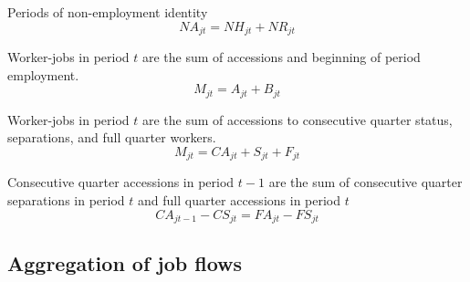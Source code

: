 \begin{definition}
Periods of non-employment identity 
\begin{equation*}
NA_{jt} = NH_{jt} + NR_{jt}
\end{equation*}
\end{definition}

\begin{definition}
Worker-jobs in period $t$ are the sum of accessions and beginning of period
employment. 
\begin{equation*}
M_{jt} = A_{jt} + B_{jt}
\end{equation*}
\end{definition}

\begin{definition}
Worker-jobs in period $t$ are the sum of accessions to consecutive quarter
status, separations, and full quarter workers. 
\begin{equation*}
M_{jt} = CA_{jt} + S_{jt} + F_{jt}
\end{equation*}
\end{definition}

\begin{definition}
Consecutive quarter accessions in period $t-1$ are the sum of consecutive
quarter separations in period $t$ and full quarter accessions in period $t$ 
\begin{equation*}
CA_{jt - 1} - CS_{jt} = FA_{jt} - FS_{jt}
\end{equation*}
\end{definition}

\subsection{Aggregation of job flows}

\label{sec:technical:aggregate_flows}

